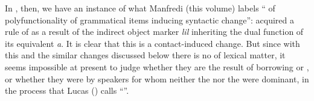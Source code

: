 \documentclass[output=paper]{langsci/langscibook}
\begin{document}
In  , then, we have an instance of what Manfredi (this volume) labels `` of polyfunctionality of grammatical items inducing syntactic change'':  acquired a rule of  as a result of the indirect object marker \textit{lil} inheriting the dual function of its  equivalent \textit{a}. It is clear that this is a contact-induced change. But since with this and the similar changes discussed below there is no  of lexical matter, it seems impossible at present to judge whether they are the result of borrowing or , or whether they were  by speakers for whom neither the  nor the  were dominant, in the process that Lucas (\citeyear{Lucas2015}) calls ``''.
\end{document}

